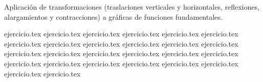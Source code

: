 
Aplicación de transformaciones (traslaciones verticales y horizontales, reflexiones, alargamientos y contracciones) a gráficas de funciones fundamentales.

\begin{enumerate}
    {ejercicio.tex}
    {ejercicio.tex}
    {ejercicio.tex}
    {ejercicio.tex}
    {ejercicio.tex}
    {ejercicio.tex}
    {ejercicio.tex}
    {ejercicio.tex}
    {ejercicio.tex}
    {ejercicio.tex}
    {ejercicio.tex}
    {ejercicio.tex}
    \setcounter{enumi}{12}
    {ejercicio.tex}
    {ejercicio.tex}
    {ejercicio.tex}
    {ejercicio.tex}
    {ejercicio.tex}
    {ejercicio.tex}
    {ejercicio.tex}
    {ejercicio.tex}
    {ejercicio.tex}
    {ejercicio.tex}
    {ejercicio.tex}
    {ejercicio.tex}
    \setcounter{enumi}{24}
    {ejercicio.tex}
    {ejercicio.tex}
\end{enumerate}
